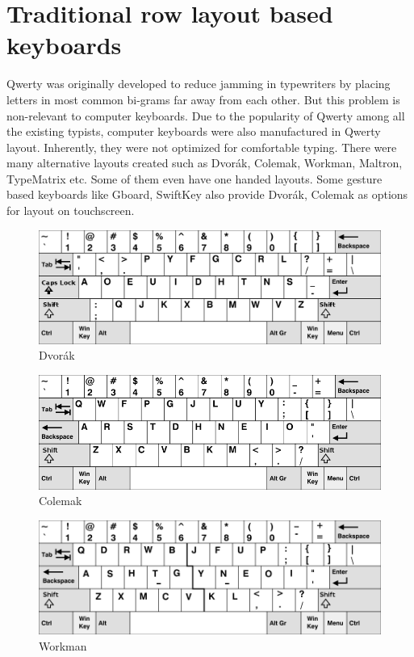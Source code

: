\documentclass[MTech]{iitmdiss}
\begin{document}
\section{Traditional row layout based keyboards}
Qwerty was originally developed to reduce jamming in typewriters by placing letters in most common bi-grams far away from each other. But this problem is non-relevant to computer keyboards. Due to the popularity of Qwerty among all the existing typists, computer keyboards were also manufactured in Qwerty layout. Inherently, they were not optimized for comfortable typing. There were many alternative layouts created such as Dvorák, Colemak, Workman, Maltron, TypeMatrix etc. Some of them even have one handed layouts. Some gesture based keyboards like Gboard, SwiftKey also provide Dvorák, Colemak as options for layout on touchscreen. 

\begin{figure}[h!]
	\centering
	\includegraphics[scale=0.35]{Images/dvorak}
	\caption{Dvorák}
\end{figure}

\begin{figure}[h!]
	\centering
	\includegraphics[scale=0.525]{Images/colemak}
	\caption{Colemak}
\end{figure}

\begin{figure}[h!]
	\centering
	\includegraphics[scale=0.47]{Images/workman}
	\caption{Workman}
\end{figure}
\end{document}
